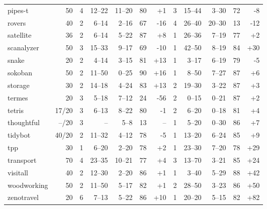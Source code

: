 \documentclass{article}
\begin{document}
\begin{table}
\begin{tabular}{l@{}rr|rrrr|r|rrrr}
       pipes-t &     50 &   4 &   12--22 &  11--20 &  80 &   {\color{blue}+1} &   3 &    15--44 &   3--30 &  72 &    {\color{red}-8} \\
        rovers &     40 &   2 &    6--14 &   2--16 &  67 &   {\color{red}-16} &   4 &    26--40 &  20--30 &  13 &   {\color{red}-12} \\
     satellite &     36 &   2 &    6--14 &   5--22 &  87 &   {\color{blue}+8} &   1 &    26--36 &   7--19 &  77 &   {\color{blue}+2} \\
    scanalyzer &     50 &   3 &   15--33 &   9--17 &  69 &   {\color{red}-10} &   1 &    42--50 &   8--19 &  84 &  {\color{blue}+30} \\
         snake &     20 &   2 &    4--14 &   3--15 &  81 &  {\color{blue}+13} &   1 &     3--17 &   6--19 &  79 &    {\color{red}-5} \\
       sokoban &     50 &   2 &   11--50 &   0--25 &  90 &  {\color{blue}+16} &   1 &     8--50 &   7--27 &  87 &   {\color{blue}+6} \\
       storage &     30 &   2 &   14--18 &   4--24 &  83 &  {\color{blue}+13} &   2 &    19--30 &   3--22 &  87 &   {\color{blue}+3} \\
        termes &     20 &   3 &    5--18 &   7--12 &  24 &   {\color{red}-56} &   2 &     0--15 &   0--21 &  87 &   {\color{blue}+2} \\
        tetris &  17/20 &   3 &    6--13 &   8--22 &  80 &    {\color{red}-1} &   2 &     6--20 &   0--18 &  81 &   {\color{blue}+4} \\
    thoughtful &  --/20 &   3 &       -- &    5--8 &  13 &                 -- &   1 &     5--20 &   0--30 &  86 &   {\color{blue}+7} \\
       tidybot &  40/20 &   2 &   11--32 &   4--12 &  78 &    {\color{red}-5} &   1 &    13--20 &   6--24 &  85 &   {\color{blue}+9} \\
           tpp &     30 &   1 &    6--20 &   2--20 &  78 &   {\color{blue}+2} &   1 &    23--30 &   7--20 &  78 &  {\color{blue}+29} \\
     transport &     70 &   4 &   23--35 &  10--21 &  77 &   {\color{blue}+4} &   3 &    13--70 &   3--21 &  85 &  {\color{blue}+24} \\
      visitall &     40 &   2 &   12--30 &   2--20 &  86 &   {\color{blue}+1} &   1 &     3--40 &   5--29 &  88 &  {\color{blue}+42} \\
   woodworking &     50 &   2 &   11--50 &   5--17 &  82 &   {\color{blue}+1} &   2 &    28--50 &   3--23 &  86 &  {\color{blue}+50} \\
    zenotravel &     20 &   6 &    7--13 &   5--22 &  86 &  {\color{blue}+10} &   1 &    20--20 &   5--15 &  82 &  {\color{blue}+82} \\
\bottomrule
\end{tabular}

            \end{table}
\end{document}
